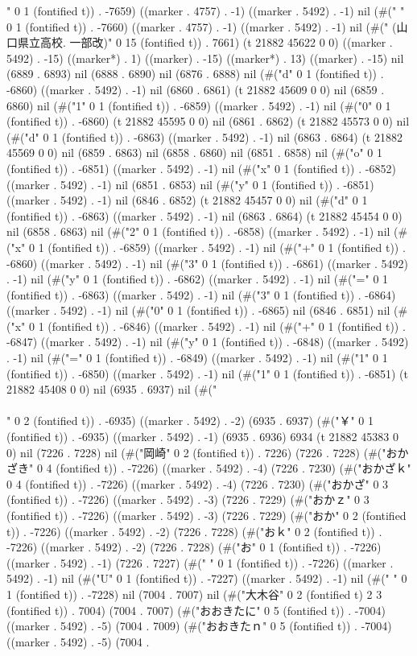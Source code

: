" 0 1 (fontified t)) . -7659) ((marker . 4757) . -1) ((marker . 5492) . -1) nil (#(" " 0 1 (fontified t)) . -7660) ((marker . 4757) . -1) ((marker . 5492) . -1) nil (#("  (山口県立高校. 一部改)" 0 15 (fontified t)) . 7661) (t 21882 45622 0 0) ((marker . 5492) . -15) ((marker*) . 1) ((marker) . -15) ((marker*) . 13) ((marker) . -15) nil (6889 . 6893) nil (6888 . 6890) nil (6876 . 6888) nil (#("d" 0 1 (fontified t)) . -6860) ((marker . 5492) . -1) nil (6860 . 6861) (t 21882 45609 0 0) nil (6859 . 6860) nil (#("1" 0 1 (fontified t)) . -6859) ((marker . 5492) . -1) nil (#("0" 0 1 (fontified t)) . -6860) (t 21882 45595 0 0) nil (6861 . 6862) (t 21882 45573 0 0) nil (#("d" 0 1 (fontified t)) . -6863) ((marker . 5492) . -1) nil (6863 . 6864) (t 21882 45569 0 0) nil (6859 . 6863) nil (6858 . 6860) nil (6851 . 6858) nil (#("o" 0 1 (fontified t)) . -6851) ((marker . 5492) . -1) nil (#("x" 0 1 (fontified t)) . -6852) ((marker . 5492) . -1) nil (6851 . 6853) nil (#("y" 0 1 (fontified t)) . -6851) ((marker . 5492) . -1) nil (6846 . 6852) (t 21882 45457 0 0) nil (#("d" 0 1 (fontified t)) . -6863) ((marker . 5492) . -1) nil (6863 . 6864) (t 21882 45454 0 0) nil (6858 . 6863) nil (#("2" 0 1 (fontified t)) . -6858) ((marker . 5492) . -1) nil (#("x" 0 1 (fontified t)) . -6859) ((marker . 5492) . -1) nil (#("+" 0 1 (fontified t)) . -6860) ((marker . 5492) . -1) nil (#("3" 0 1 (fontified t)) . -6861) ((marker . 5492) . -1) nil (#("y" 0 1 (fontified t)) . -6862) ((marker . 5492) . -1) nil (#("=" 0 1 (fontified t)) . -6863) ((marker . 5492) . -1) nil (#("3" 0 1 (fontified t)) . -6864) ((marker . 5492) . -1) nil (#("0" 0 1 (fontified t)) . -6865) nil (6846 . 6851) nil (#("x" 0 1 (fontified t)) . -6846) ((marker . 5492) . -1) nil (#("+" 0 1 (fontified t)) . -6847) ((marker . 5492) . -1) nil (#("y" 0 1 (fontified t)) . -6848) ((marker . 5492) . -1) nil (#("=" 0 1 (fontified t)) . -6849) ((marker . 5492) . -1) nil (#("1" 0 1 (fontified t)) . -6850) ((marker . 5492) . -1) nil (#("1" 0 1 (fontified t)) . -6851) (t 21882 45408 0 0) nil (6935 . 6937) nil (#("\\\\" 0 2 (fontified t)) . -6935) ((marker . 5492) . -2) (6935 . 6937) (#("￥" 0 1 (fontified t)) . -6935) ((marker . 5492) . -1) (6935 . 6936) 6934 (t 21882 45383 0 0) nil (7226 . 7228) nil (#("岡崎" 0 2 (fontified t)) . 7226) (7226 . 7228) (#("おかざき" 0 4 (fontified t)) . -7226) ((marker . 5492) . -4) (7226 . 7230) (#("おかざｋ" 0 4 (fontified t)) . -7226) ((marker . 5492) . -4) (7226 . 7230) (#("おかざ" 0 3 (fontified t)) . -7226) ((marker . 5492) . -3) (7226 . 7229) (#("おかｚ" 0 3 (fontified t)) . -7226) ((marker . 5492) . -3) (7226 . 7229) (#("おか" 0 2 (fontified t)) . -7226) ((marker . 5492) . -2) (7226 . 7228) (#("おｋ" 0 2 (fontified t)) . -7226) ((marker . 5492) . -2) (7226 . 7228) (#("お" 0 1 (fontified t)) . -7226) ((marker . 5492) . -1) (7226 . 7227) (#(" " 0 1 (fontified t)) . -7226) ((marker . 5492) . -1) nil (#("U" 0 1 (fontified t)) . -7227) ((marker . 5492) . -1) nil (#(" " 0 1 (fontified t)) . -7228) nil (7004 . 7007) nil (#("大木谷" 0 2 (fontified t) 2 3 (fontified t)) . 7004) (7004 . 7007) (#("おおきたに" 0 5 (fontified t)) . -7004) ((marker . 5492) . -5) (7004 . 7009) (#("おおきたｎ" 0 5 (fontified t)) . -7004) ((marker . 5492) . -5) (7004 . 